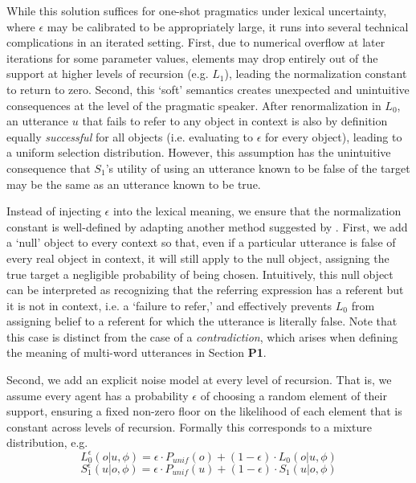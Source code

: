 \documentclass[10pt, man, floatsintext]{apa7}
\begin{document}
While this solution suffices for one-shot pragmatics under lexical uncertainty, where $\epsilon$ may be calibrated to be appropriately large, it runs into several technical complications in an iterated setting.
First, due to numerical overflow at later iterations for some parameter values, elements may drop entirely out of the support at higher levels of recursion (e.g. $L_1$), leading the normalization constant to return to zero. 
Second, this `soft' semantics creates unexpected and unintuitive consequences at the level of the pragmatic speaker. 
After renormalization in $L_0$, an utterance $u$ that fails to refer to any object in context is also by definition equally \emph{successful} for all objects (i.e. evaluating to $\epsilon$ for every object), leading to a uniform selection distribution.
However, this assumption has the unintuitive consequence that $S_1$'s utility of using an utterance known to be false of the target may be the same as an utterance known to be true.



Instead of injecting $\epsilon$ into the lexical meaning, we ensure that the normalization constant is well-defined by adapting another method suggested by .
First, we add a `null' object to every context so that, even if a particular utterance is false of every real object in context, it will still apply to the null object, assigning the true target a negligible probability of being chosen.
Intuitively, this null object can be interpreted as recognizing that the referring expression has a referent but it is not in context, i.e. a `failure to refer,' and effectively prevents $L_0$ from assigning belief to a referent for which the utterance is literally false.
Note that this case is distinct from the case of a \emph{contradiction}, which arises when defining the meaning of multi-word utterances in Section \textbf{P1}.

Second, we add an explicit noise model at every level of recursion.
That is, we assume every agent has a probability $\epsilon$ of choosing a random element of their support, ensuring a fixed non-zero floor on the likelihood of each element that is constant across levels of recursion.
Formally this corresponds to a mixture distribution, e.g. 
$$L_0^{\epsilon}(o|u,\phi) = \epsilon \cdot P_{unif}(o) + (1-\epsilon) \cdot L_0(o|u,\phi)$$
$$S_1^{\epsilon}(u|o,\phi) = \epsilon \cdot P_{unif}(u) + (1-\epsilon) \cdot S_1(u|o,\phi)$$
\end{document}
